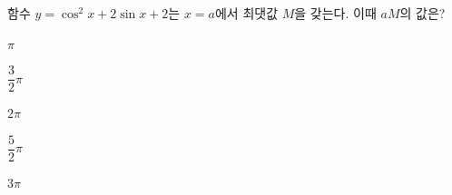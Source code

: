 함수 $y=\cos^2 x+2\sin x+2$는 $x=a$에서 최댓값 $M$을 갖는다. 이때 $aM$의 값은? 
\begin{choices32}{\rule[-3ex]{0pt}{8ex}$\pi$}{\rule[-3ex]{0pt}{8ex}$\dfrac{3}{2}\pi$}{\rule[-3ex]{0pt}{8ex}$2\pi$}{\rule[-3ex]{0pt}{8ex}$\dfrac{5}{2}\pi$}{\rule[-3ex]{0pt}{8ex}$3\pi$}\end{choices32}
